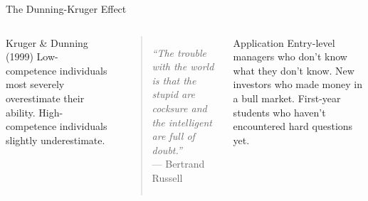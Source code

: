 \documentclass[aspectratio=169]{beamer}
\begin{document}
\begin{frame}{The Dunning-Kruger Effect}
\begin{columns}
\begin{block}{Kruger \& Dunning (1999)}
Low-competence individuals most severely overestimate their ability. High-competence individuals slightly underestimate.
\end{block}
\begin{quote}
\textit{``The trouble with the world is that the stupid are cocksure and the intelligent are full of doubt.''}\\--- Bertrand Russell
\end{quote}
\begin{exampleblock}{Application}
Entry-level managers who don't know what they don't know. New investors who made money in a bull market. First-year students who haven't encountered hard questions yet.
\end{exampleblock}
\end{columns}
\end{frame}
\end{document}
